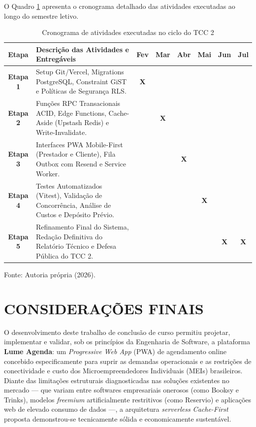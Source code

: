 \documentclass[12pt,a4paper]{article}
\begin{document}
O Quadro \ref{tab:cronograma_detalhado} apresenta o cronograma detalhado das atividades executadas ao longo do semestre letivo.

\begin{table}[hbt]
\centering
\caption{Cronograma de atividades executadas no ciclo do TCC 2}
\label{tab:cronograma_detalhado}
\footnotesize 
\renewcommand{\arraystretch}{1.2} 
\begin{tabularx}{\textwidth}{|c|X|c|c|c|c|c|c|}
\hline
\textbf{Etapa} & \textbf{Descrição das Atividades e Entregáveis} & \textbf{Fev} & \textbf{Mar} & \textbf{Abr} & \textbf{Mai} & \textbf{Jun} & \textbf{Jul} \\ \hline
\textbf{Etapa 1} & Setup Git/Vercel, Migrations PostgreSQL, Constraint GiST e Políticas de Segurança RLS. & \textbf{X} & & & & & \\ \hline
\textbf{Etapa 2} & Funções RPC Transacionais ACID, Edge Functions, Cache-Aside (Upstash Redis) e Write-Invalidate. & & \textbf{X} & & & & \\ \hline
\textbf{Etapa 3} & Interfaces PWA Mobile-First (Prestador e Cliente), Fila Outbox com Resend e Service Worker. & & & \textbf{X} & & & \\ \hline
\textbf{Etapa 4} & Testes Automatizados (Vitest), Validação de Concorrência, Análise de Custos e Depósito Prévio. & & & & \textbf{X} & & \\ \hline
\textbf{Etapa 5} & Refinamento Final do Sistema, Redação Definitiva do Relatório Técnico e Defesa Pública do TCC 2. & & & & & \textbf{X} & \textbf{X} \\ \hline
\end{tabularx}
\vspace{0.1cm}
{\footnotesize Fonte: Autoria própria (2026).}
\end{table}

\section{CONSIDERAÇÕES FINAIS}
\label{sec:consideracoes_finais}
\justifying

O desenvolvimento deste trabalho de conclusão de curso permitiu projetar, implementar e validar, sob os princípios da Engenharia de Software, a plataforma \textbf{Lume Agenda}: um \textit{Progressive Web App} (PWA) de agendamento online concebido especificamente para suprir as demandas operacionais e as restrições de conectividade e custo dos Microempreendedores Individuais (MEIs) brasileiros. Diante das limitações estruturais diagnosticadas nas soluções existentes no mercado --- que variam entre softwares empresariais onerosos (como Booksy e Trinks), modelos \textit{freemium} artificialmente restritivos (como Reservio) e aplicações web de elevado consumo de dados ---, a arquitetura \textit{serverless Cache-First} proposta demonstrou-se tecnicamente sólida e economicamente sustentável.
\end{document}
